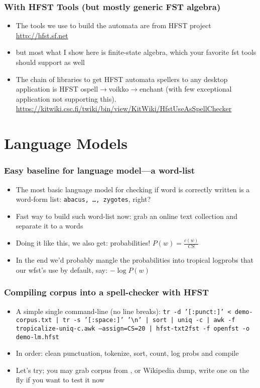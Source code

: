 \documentclass[t,12pt]{beamer}
\begin{document}
\begin{frame}
    \frametitle{With HFST Tools (but mostly generic FST algebra)}
    
    \begin{itemize}
        \item The tools we use to build the automata are from HFST project
            \url{http://hfst.sf.net}
        \item but most what I show here is finite-state algebra, which your
            favorite fst tools should support as well
        \item The chain of libraries to get HFST automata spellers to any
            desktop application is HFST 
            ospell$\rightarrow$voikko$\rightarrow$enchant (with few
            exceptional application not supporting this).
            \url{https://kitwiki.csc.fi/twiki/bin/view/KitWiki/HfstUseAsSpellChecker}
    \end{itemize}
\end{frame}

\section{Language Models}

\begin{frame}
    \frametitle{Easy baseline for language model---a word-list}
    \begin{itemize}
        \item The most basic language model for checking if word is correctly
            written is a word-form list: \texttt{abacus, \ldots, zygotes}, 
            right?
        \item Fast way to build such word-list now: grab an online text
            collection and separate it to a words
        \item Doing it like this, we also get: probabilities!
            $P(w) = \frac{c(w)}{CS}$
        \item In the end we'd probably mangle the probabilities into
            tropical logprobs that our wfst's use by default, say:
            $-\log P(w)$
    \end{itemize}
\end{frame}

\begin{frame}
    \frametitle{Compiling corpus into a spell-checker with HFST}
    \begin{itemize}
        \item A simple single command-line (no line breaks):
            \texttt{tr -d '[:punct:]' < demo-corpus.txt |
            tr -s '[:space:]' '\textbackslash n' |
            sort | uniq -c |
            awk -f tropicalize-uniq-c.awk --assign=CS=20 |
            hfst-txt2fst -f openfst -o demo-lm.hfst}
        \item In order: clean punctuation, tokenize, sort, count, log probs and
            compile
        \item Let's try; you may grab corpus from
            \url{}, or Wikipedia dump,  write one on the fly if you want to
            test it now
    \end{itemize}
\end{frame}
\end{document}
